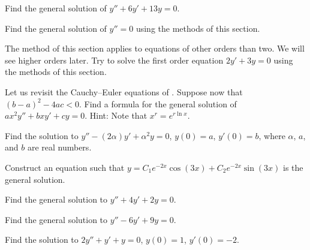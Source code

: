 \begin{exercise}
Find the general solution of $y'' + 6 y' + 13 y = 0$.
\end{exercise}

\begin{exercise}
Find the general solution of $y'' = 0$ using the methods of this section.
\end{exercise}

\begin{exercise}
The method of this section applies to equations of other orders than two.
We will see
higher orders later.  Try to solve the first order equation
$2y' + 3y = 0$ using the methods of this section.
\end{exercise}

\begin{exercise}
Let us revisit the Cauchy--Euler equations of
.  Suppose now
that ${(b-a)}^2-4ac < 0$.  Find a formula for the general solution
of $a x^2 y'' + b x y' + c y = 0$.  Hint: Note that $x^r = e^{r \ln x}$.
\end{exercise}

\begin{exercise}
Find the solution to
$y''-(2\alpha) y' + \alpha^2 y=0$, $y(0) = a$, $y'(0)=b$,
where $\alpha$, $a$, and $b$ are real numbers.
\end{exercise}

\begin{exercise}
Construct an equation such that $y = C_1 e^{-2x} \cos(3x) + C_2 e^{-2x}
\sin(3x)$ is the general
solution.
\end{exercise}

\setcounter{exercise}{100}

\begin{exercise}
Find the general solution to
$y''+4y'+2y=0$.
\end{exercise}

\begin{exercise}
Find the general solution to
$y''-6y'+9y=0$.
\end{exercise}

\begin{exercise}
Find the solution to
$2y''+y'+y=0$, $y(0) = 1$, $y'(0)=-2$.
\end{exercise}

